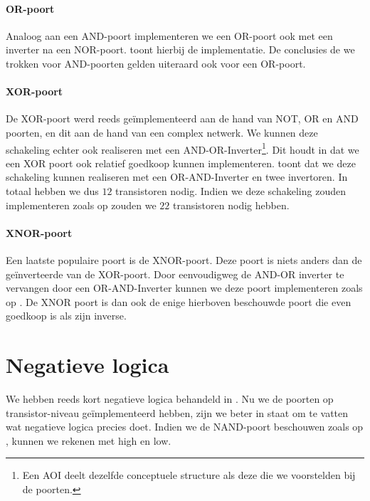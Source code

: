 \paragraph{OR-poort}
Analoog aan een AND-poort implementeren we een OR-poort ook met een inverter na een NOR-poort.  toont hierbij de implementatie. De conclusies de we trokken voor AND-poorten gelden uiteraard ook voor een OR-poort.

\paragraph{XOR-poort}
De XOR-poort werd reeds ge\"implementeerd aan de hand van NOT, OR en AND poorten, en dit aan de hand van een complex netwerk. We kunnen deze schakeling echter ook realiseren met een AND-OR-Inverter\footnote{Een AOI deelt dezelfde conceptuele structure als deze die we voorstelden bij de poorten.}. Dit houdt in dat we een XOR poort ook relatief goedkoop kunnen implementeren.  toont dat we deze schakeling kunnen realiseren met een OR-AND-Inverter en twee invertoren. In totaal hebben we dus $12$ transistoren nodig. Indien we deze schakeling zouden implementeren zoals op  zouden we $22$ transistoren nodig hebben.

\paragraph{XNOR-poort}
Een laatste populaire poort is de XNOR-poort. Deze poort is niets anders dan de ge\"inverteerde van de XOR-poort. Door eenvoudigweg de AND-OR inverter te vervangen door een OR-AND-Inverter kunnen we deze poort implementeren zoals op . De XNOR poort is dan ook de enige hierboven beschouwde poort die even goedkoop is als zijn inverse.

\section{Negatieve logica}
We hebben reeds kort negatieve logica behandeld in . Nu we de poorten op transistor-niveau ge\"implementeerd hebben, zijn we beter in staat om te vatten wat negatieve logica precies doet. Indien we de NAND-poort beschouwen zoals op , kunnen we rekenen met high en low. 


